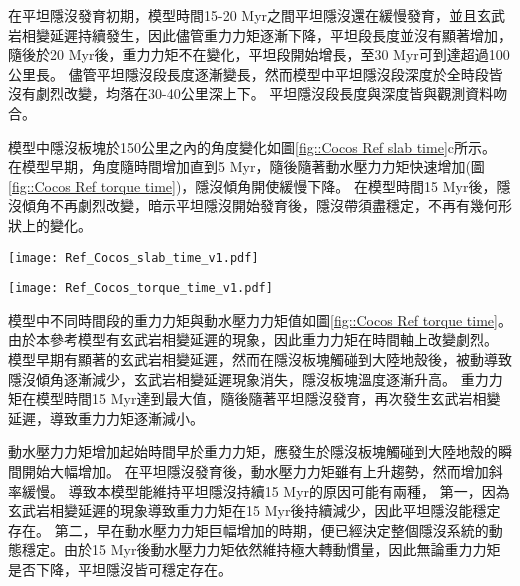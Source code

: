在平坦隱沒發育初期，模型時間15-20 Myr之間平坦隱沒還在緩慢發育，並且玄武岩相變延遲持續發生，因此儘管重力力矩逐漸下降，平坦段長度並沒有顯著增加，隨後於20 Myr後，重力力矩不在變化，平坦段開始增長，至30 Myr可到達超過100公里長。
儘管平坦隱沒段長度逐漸變長，然而模型中平坦隱沒段深度於全時段皆沒有劇烈改變，均落在30-40公里深上下。
平坦隱沒段長度與深度皆與觀測資料吻合。

模型中隱沒板塊於150公里之內的角度變化如圖\ref{fig::Cocos Ref slab time}c所示。
在模型早期，角度隨時間增加直到5 Myr，隨後隨著動水壓力力矩快速增加(圖\ref{fig::Cocos Ref torque time})，隱沒傾角開使緩慢下降。
在模型時間15 Myr後，隱沒傾角不再劇烈改變，暗示平坦隱沒開始發育後，隱沒帶須盡穩定，不再有幾何形狀上的變化。

\begin{figure*}[h]
    \centering
    \texttt{[image: Ref\_Cocos\_slab\_time\_v1.pdf]}
    \caption[科克斯參考模型隱沒板塊狀態隨時間變化]{科克斯參考模型隱沒板塊狀態隨時間變化。}
    \label{fig::Cocos Ref slab time}
\end{figure*}

\begin{figure*}[hb]
    \centering
    \texttt{[image: Ref\_Cocos\_torque\_time\_v1.pdf]}
    \caption[科克斯參考模型重力力矩與動水壓力矩隨時間變化]{科克斯參考模型重力力矩與動水壓力矩隨時間變化。}
    \label{fig::Cocos Ref torque time}
\end{figure*}


模型中不同時間段的重力力矩與動水壓力力矩值如圖\ref{fig::Cocos Ref torque time}。
由於本參考模型有玄武岩相變延遲的現象，因此重力力矩在時間軸上改變劇烈。
模型早期有顯著的玄武岩相變延遲，然而在隱沒板塊觸碰到大陸地殼後，被動導致隱沒傾角逐漸減少，玄武岩相變延遲現象消失，隱沒板塊溫度逐漸升高。
重力力矩在模型時間15 Myr達到最大值，隨後隨著平坦隱沒發育，再次發生玄武岩相變延遲，導致重力力矩逐漸減小。

動水壓力力矩增加起始時間早於重力力矩，應發生於隱沒板塊觸碰到大陸地殼的瞬間開始大幅增加。
在平坦隱沒發育後，動水壓力力矩雖有上升趨勢，然而增加斜率緩慢。
導致本模型能維持平坦隱沒持續15 Myr的原因可能有兩種，
第一，因為玄武岩相變延遲的現象導致重力力矩在15 Myr後持續減少，因此平坦隱沒能穩定存在。
第二，早在動水壓力力矩巨幅增加的時期，便已經決定整個隱沒系統的動態穩定。由於15 Myr後動水壓力力矩依然維持極大轉動慣量，因此無論重力力矩是否下降，平坦隱沒皆可穩定存在。